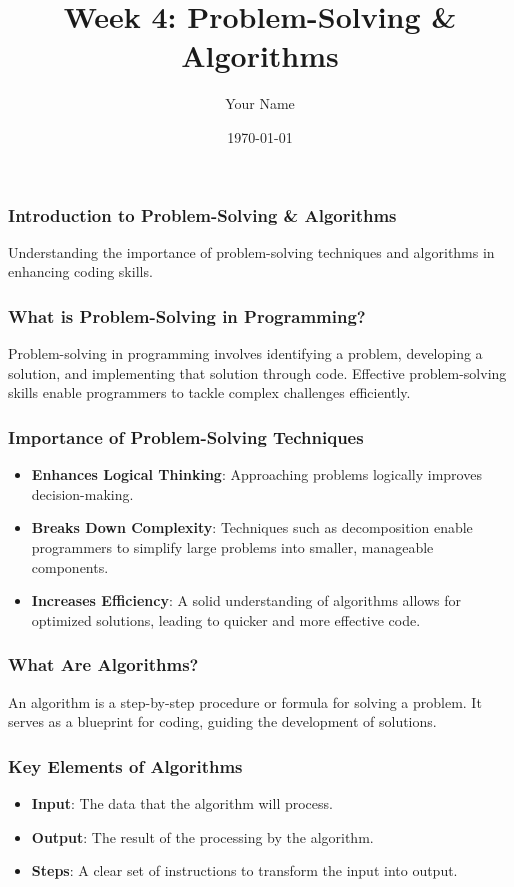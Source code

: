 \documentclass{beamer}
\title{Week 4: Problem-Solving \& Algorithms}
\author{Your Name}
\institute{Your Institution}
\date{\today}
\begin{document}
\frame{\titlepage}

\begin{frame}[fragile]
    \frametitle{Introduction to Problem-Solving \& Algorithms}
    Understanding the importance of problem-solving techniques and algorithms in enhancing coding skills.
\end{frame}

\begin{frame}[fragile]
    \frametitle{What is Problem-Solving in Programming?}
    Problem-solving in programming involves identifying a problem, developing a solution, and implementing that solution through code. Effective problem-solving skills enable programmers to tackle complex challenges efficiently.
\end{frame}

\begin{frame}[fragile]
    \frametitle{Importance of Problem-Solving Techniques}
    \begin{itemize}
        \item \textbf{Enhances Logical Thinking}: Approaching problems logically improves decision-making.
        \item \textbf{Breaks Down Complexity}: Techniques such as decomposition enable programmers to simplify large problems into smaller, manageable components.
        \item \textbf{Increases Efficiency}: A solid understanding of algorithms allows for optimized solutions, leading to quicker and more effective code.
    \end{itemize}
\end{frame}

\begin{frame}[fragile]
    \frametitle{What Are Algorithms?}
    An algorithm is a step-by-step procedure or formula for solving a problem. It serves as a blueprint for coding, guiding the development of solutions.
\end{frame}

\begin{frame}[fragile]
    \frametitle{Key Elements of Algorithms}
    \begin{itemize}
        \item \textbf{Input}: The data that the algorithm will process.
        \item \textbf{Output}: The result of the processing by the algorithm.
        \item \textbf{Steps}: A clear set of instructions to transform the input into output.
    \end{itemize}
\end{frame}
\end{document}
